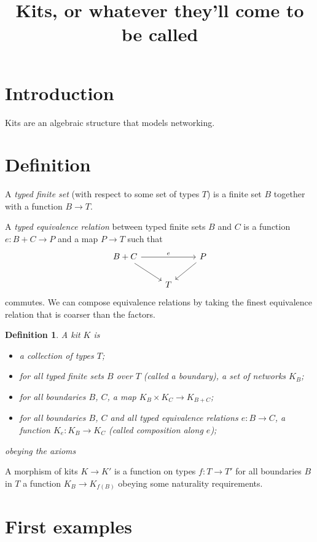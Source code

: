 \documentclass{article}
\title{Kits, or whatever they'll come to be called}
\author{}
\date{}
\newtheorem{definition}{Definition}[section]
\theoremstyle{remark}
\begin{document}
\maketitle

\section{Introduction}

Kits are an algebraic structure that models networking.

\section{Definition}

A \emph{typed finite set} (with respect to some set of types $T$) is a finite
set $B$ together with a function $B \to T$.

A \emph{typed equivalence relation} between typed finite sets $B$ and $C$ is a
function $e\colon B+C \to P$ and a map $P \to T$ such that
\[
\begin{tikzcd}
B+C \ar[rr, "e"] \ar[dr] && P \ar[dl]\\
& T
\end{tikzcd}
\]
commutes. We can compose equivalence relations by taking the finest equivalence
relation that is coarser than the factors.

\begin{definition}
A \emph{kit} $K$ is
\begin{itemize}
\item a collection of \emph{types} $T$;
\item for all typed finite sets $B$ over $T$ (called a \emph{boundary}), a set
of \emph{networks} $K_B$;
\item for all boundaries $B$, $C$, a map $K_B\times K_C \to K_{B+C}$;
\item for all boundaries $B$, $C$ and all typed equivalence relations $e\colon B
\to C$, a function $K_e\colon K_B \to K_C$ (called \emph{composition along
$e$});
\end{itemize}
obeying the axioms
\end{definition}

A morphism of kits $K \to K'$ is a function on types $f\colon T \to T'$ for all
boundaries $B$ in $T$ a function $K_B \to K_{f(B)}$ obeying some naturality
requirements.

\section{First examples}
\end{document}
